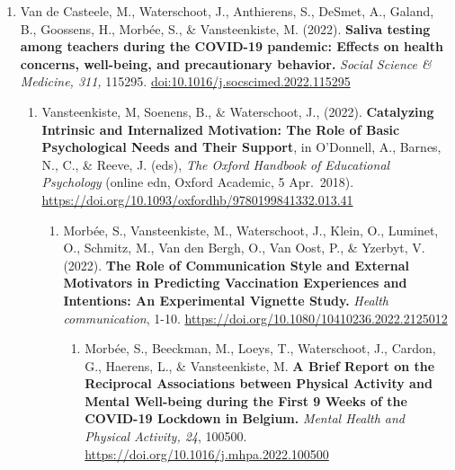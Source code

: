 \documentclass[
  twocolumn]{article}
\providecommand{\tightlist}{%
  \setlength{\itemsep}{0pt}\setlength{\parskip}{0pt}}
\begin{document}
\begin{enumerate}
\begin{enumerate}
\begin{enumerate}
\begin{enumerate}
        \begin{enumerate}
        \def\labelenumv{\arabic{enumv}.}
        \tightlist
        \item
          Van de Casteele, M., Waterschoot, J., Anthierens, S., DeSmet,
          A., Galand, B., Goossens, H., Morbée, S., \& Vansteenkiste, M.
          (2022). \textbf{Saliva testing among teachers during the
          COVID-19 pandemic: Effects on health concerns, well-being, and
          precautionary behavior.} \emph{Social Science \& Medicine,
          311,} 115295. \url{doi:10.1016/j.socscimed.2022.115295}

          \begin{enumerate}
          \def\labelenumvi{\arabic{enumvi}.}
          \tightlist
          \item
            Vansteenkiste, M, Soenens, B., \& Waterschoot, J., (2022).
            \textbf{Catalyzing Intrinsic and Internalized Motivation:
            The Role of Basic Psychological Needs and Their Support}, in
            O'Donnell, A., Barnes, N., C., \& Reeve, J. (eds), \emph{The
            Oxford Handbook of Educational Psychology} (online edn,
            Oxford Academic, 5 Apr.~2018).
            \url{https://doi.org/10.1093/oxfordhb/9780199841332.013.41}

            \begin{enumerate}
            \def\labelenumvii{\arabic{enumvii}.}
            \tightlist
            \item
              Morbée, S., Vansteenkiste, M., Waterschoot, J., Klein, O.,
              Luminet, O., Schmitz, M., Van den Bergh, O., Van Oost, P.,
              \& Yzerbyt, V. (2022). \textbf{The Role of Communication
              Style and External Motivators in Predicting Vaccination
              Experiences and Intentions: An Experimental Vignette
              Study.} \emph{Health communication}, 1-10.
              \url{https://doi.org/10.1080/10410236.2022.2125012}

              \begin{enumerate}
              \def\labelenumviii{\arabic{enumviii}.}
              \tightlist
              \item
                Morbée, S., Beeckman, M., Loeys, T., Waterschoot, J.,
                Cardon, G., Haerens, L., \& Vansteenkiste, M. \textbf{A
                Brief Report on the Reciprocal Associations between
                Physical Activity and Mental Well-being during the First
                9 Weeks of the COVID-19 Lockdown in Belgium.}
                \emph{Mental Health and Physical Activity, 24}, 100500.
                \url{https://doi.org/10.1016/j.mhpa.2022.100500}


\end{enumerate}
\end{enumerate}
\end{enumerate}
\end{enumerate}
\end{enumerate}
\end{enumerate}
\end{enumerate}
\end{enumerate}
\end{document}
